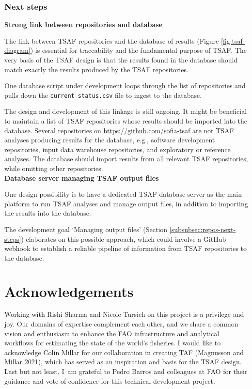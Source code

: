 \documentclass[12pt]{article}
\newcommand\blue[1]{\textcolor{darkblue}{#1}}
\begin{document}
\subsubsection{Next steps}

\textbf{Strong link between repositories and database}

The link between TSAF repositories and the database of results (Figure
\ref{fig:tsaf-diagram}) is essential for traceability and the fundamental
purpose of TSAF. The very basis of the TSAF design is that the results found in
the database should match exactly the results produced by the TSAF repositories.

One database script under development loops through the list of repositories and
pulls down the \verb|current_status.csv| file to ingest to the database.

The design and development of this linkage is still ongoing. It might be
beneficial to maintain a list of TSAF repositories whose results should be
imported into the database. Several repositories on
\blue{\url{https://github.com/sofia-tsaf}} are not TSAF analyses producing
results for the database, e.g., software development repositories, input data
warehouse repositories, and exploratory or reference analyses. The database
should import results from all relevant TSAF repositories, while omitting other
repositories.\\[-2ex]

\textbf{Database server managing TSAF output files}

One design possibility is to have a dedicated TSAF database server as the main
platform to run TSAF analyses and manage output files, in addition to importing
the results into the database.

The development goal `Managing output files' (Section
\ref{subsubsec:repos-next-steps}) elaborates on this possible approach, which
could involve a GitHub webhook to establish a reliable pipeline of information
from TSAF repositories to the database.

\newpage

\section{Acknowledgements}

Working with Rishi Sharma and Nicole Tursich on this project is a privilege and
joy. Our domains of expertise complement each other, and we share a common
vision and enthusiasm to enhance the FAO infrastructure and analytical workflows
for estimating the state of the world's fisheries. I would like to acknowledge
Colin Millar for our collaboration in creating TAF (Magnusson and Millar 2021),
which has served as an inspiration and basis for the TSAF design. Last but not
least, I~am grateful to Pedro Barros and colleagues at FAO for their guidance
and vote of confidence for this technical development project.\\[-1ex]
\end{document}
